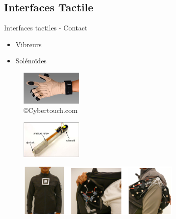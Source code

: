 \subsection{Interfaces Tactile}
\begin{frame}{Interfaces tactiles - Contact}
\begin{itemize}
\item Vibreurs
\item Solénoïdes
\end{itemize}

\begin{multicols}{2}
\begin{figure}
\centering
\includegraphics[width=3cm]{images/cybertouch}
\caption{\copyright Cybertouch.com}
\end{figure}
\begin{figure}
\centering
\includegraphics[width=3cm]{images/hapticPen}
\vspace{-0.2cm}
\caption{\cite{Lee2004}}
\end{figure}
\end{multicols}

\vspace{-1cm}

\begin{figure}
\centering
\includegraphics[width=8cm]{images/Rahman2010}
\caption{\cite{Rahman2010}}
\end{figure}

\end{frame}


